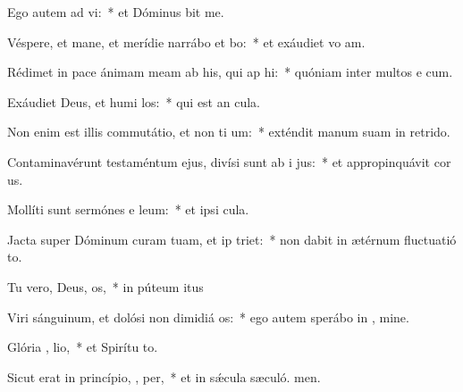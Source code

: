 \item Ego autem ad  vi:~* et Dóminus bit me.
\item Véspere, et mane, et merídie narrábo et bo:~* et exáudiet vo am.
\item Rédimet in pace ánimam meam ab his, qui ap hi:~* quóniam inter multos e cum.
\item Exáudiet Deus, et humi los:~* qui est an cula.
\item Non enim est illis commutátio, et non ti um:~* exténdit manum suam in retrido.
\item Contaminavérunt testaméntum ejus, divísi sunt ab i  jus:~* et appropinquávit cor us.
\item Mollíti sunt sermónes e  leum:~* et ipsi  cula.
\item Jacta super Dóminum curam tuam, et ip  triet:~* non dabit in ætérnum fluctuatió to.
\item Tu vero, Deus,  os,~* in púteum itus
\item Viri sánguinum, et dolósi non dimidiá  os:~* ego autem sperábo in , mine.
\item Glória ,  lio,~* et Spirítu to.
\item Sicut erat in princípio,  ,  per,~* et in sǽcula sæculó. men.
